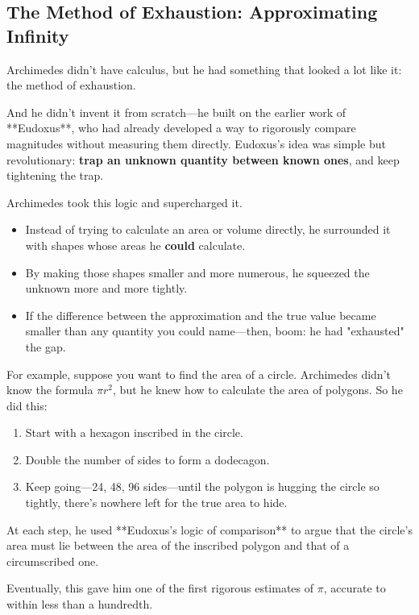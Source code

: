 \subsection{The Method of Exhaustion: Approximating Infinity}  

Archimedes didn’t have calculus, but he had something that looked a lot like it: the method of exhaustion.  

And he didn’t invent it from scratch—he built on the earlier work of **Eudoxus**, who had already developed a way to rigorously compare magnitudes without measuring them directly. Eudoxus’s idea was simple but revolutionary: \textbf{trap an unknown quantity between known ones}, and keep tightening the trap.

Archimedes took this logic and supercharged it.  

\begin{itemize}
    \item Instead of trying to calculate an area or volume directly, he surrounded it with shapes whose areas he \textbf{could} calculate.
    \item By making those shapes smaller and more numerous, he squeezed the unknown more and more tightly.
    \item If the difference between the approximation and the true value became smaller than any quantity you could name—then, boom: he had "exhausted" the gap.
\end{itemize}

For example, suppose you want to find the area of a circle. Archimedes didn’t know the formula \(\pi r^2\), but he knew how to calculate the area of polygons. So he did this:

\begin{enumerate}
    \item Start with a hexagon inscribed in the circle.
    \item Double the number of sides to form a dodecagon.
    \item Keep going—24, 48, 96 sides—until the polygon is hugging the circle so tightly, there's nowhere left for the true area to hide.
\end{enumerate}

At each step, he used **Eudoxus’s logic of comparison** to argue that the circle’s area must lie between the area of the inscribed polygon and that of a circumscribed one.

Eventually, this gave him one of the first rigorous estimates of \(\pi\), accurate to within less than a hundredth.  

